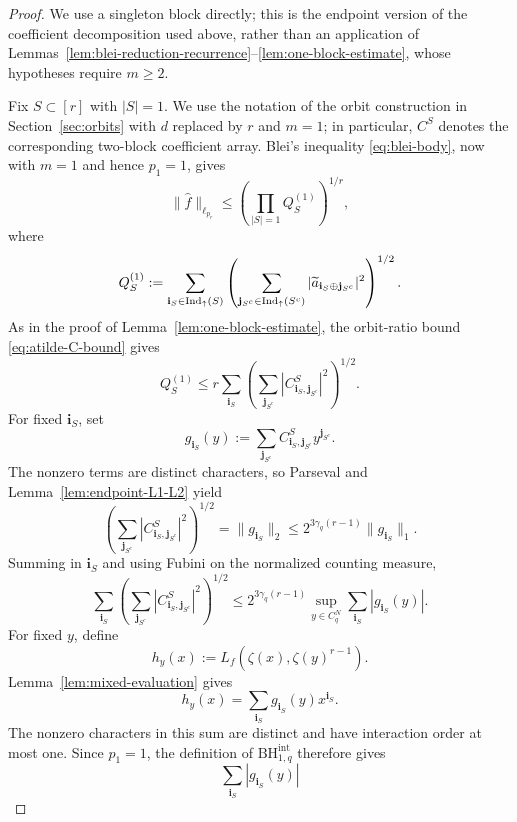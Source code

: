 \documentclass[10pt,a4paper]{amsart}
\newcommand{\BHint}[2]{\mathrm{BH}^{\mathrm{int}}_{#1,#2}}
\newcommand{\Indup}{\textcolor{black}{\operatorname{Ind}_{\uparrow}}}
\begin{document}
\begin{proof}
We use a singleton block directly; this is the endpoint version of the
coefficient decomposition used above, rather than an application of
Lemmas~\ref{lem:blei-reduction-recurrence}--\ref{lem:one-block-estimate}, whose
hypotheses require $m\geq2$.

Fix $S\subset[r]$ with $|S|=1$.  We use the notation of the orbit
construction in Section~\ref{sec:orbits} with $d$ replaced by $r$ and
$m=1$; in particular, $C^S$ denotes the corresponding two-block coefficient
array.  Blei's inequality
\eqref{eq:blei-body}, now with $m=1$ and hence $p_1=1$, gives
\begin{equation}\label{eq:coarse-Blei-singleton}
 \|\widehat f\|_{\ell_{p_r}}
 \leq
 \left(
 \prod_{|S|=1} Q_S^{(1)}
 \right)^{1/r},
\end{equation}
where
\[
 Q_S^{(1)}:=
 \sum_{\mathbf i_S\in\Indup(S)}
 \left(
 \sum_{\mathbf j_{S^c}\in\Indup(S^c)}
 |\widetilde a_{\mathbf i_S\oplus\mathbf j_{S^c}}|^2
 \right)^{1/2}.
\]
As in the proof of Lemma~\ref{lem:one-block-estimate}, the orbit-ratio bound
\eqref{eq:atilde-C-bound} gives
\begin{equation}\label{eq:coarse-orbit-singleton}
 Q_S^{(1)}
 \leq r
 \sum_{\mathbf i_S}
 \left(
 \sum_{\mathbf j_{S^c}}
 |C^S_{\mathbf i_S,\mathbf j_{S^c}}|^2
 \right)^{1/2}.
\end{equation}
For fixed $\mathbf i_S$, set
\[
 g_{\mathbf i_S}(y)
 :=\sum_{\mathbf j_{S^c}}
 C^S_{\mathbf i_S,\mathbf j_{S^c}}y^{\mathbf j_{S^c}}.
\]
The nonzero terms are distinct characters, so Parseval and
Lemma~\ref{lem:endpoint-L1-L2} yield
\[
 \left(
 \sum_{\mathbf j_{S^c}}
 |C^S_{\mathbf i_S,\mathbf j_{S^c}}|^2
 \right)^{1/2}
 =\|g_{\mathbf i_S}\|_2
 \leq
 2^{3\gamma_q(r-1)}\|g_{\mathbf i_S}\|_1.
\]
Summing in $\mathbf i_S$ and using Fubini on the normalized counting measure,
\begin{equation}\label{eq:coarse-Fubini-singleton}
 \sum_{\mathbf i_S}
 \left(
 \sum_{\mathbf j_{S^c}}
 |C^S_{\mathbf i_S,\mathbf j_{S^c}}|^2
 \right)^{1/2}
 \leq
 2^{3\gamma_q(r-1)}
 \sup_{y\in C_q^N}\sum_{\mathbf i_S}|g_{\mathbf i_S}(y)|.
\end{equation}
For fixed $y$, define
\[
 h_y(x):=L_f(\zeta(x),\zeta(y)^{r-1}).
\]
Lemma~\ref{lem:mixed-evaluation} gives
\[
 h_y(x)=\sum_{\mathbf i_S}g_{\mathbf i_S}(y)x^{\mathbf i_S}.
\]
The nonzero characters in this sum are distinct and have interaction order at
most one.  Since $p_1=1$, the definition of $\BHint{1}{q}$ therefore gives
\[
 \sum_{\mathbf i_S}|g_{\mathbf i_S}(y)|
\]
\end{proof}
\end{document}
